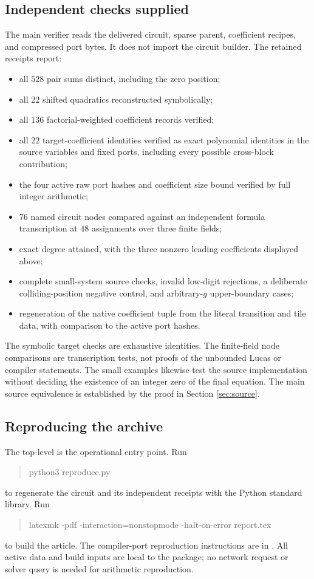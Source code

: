 \documentclass[11pt,a4paper]{article}
\theoremstyle{remark}
\newcommand{\file}[1]{\texttt{\path{#1}}}
\begin{document}
\subsection{Independent checks supplied}
The main verifier reads the delivered circuit, sparse parent,
coefficient recipes, and compressed port bytes. It does not import
the circuit builder. The retained receipts report:
\begin{itemize}
\item all \(528\) pair sums distinct, including the zero position;
\item all \(22\) shifted quadratics reconstructed symbolically;
\item all \(136\) factorial-weighted coefficient records verified;
\item all \(22\) target-coefficient identities verified as exact
polynomial identities in the source variables and fixed ports,
including every possible cross-block contribution;
\item the four active raw port hashes and coefficient size bound
verified by full integer arithmetic;
\item \(76\) named circuit nodes compared against an independent
formula transcription at \(48\) assignments over three finite fields;
\item exact degree attained, with the three nonzero leading
coefficients displayed above;
\item complete small-system source checks, invalid low-digit
rejections, a deliberate colliding-position negative control,
and arbitrary-\(g\) upper-boundary cases;
\item regeneration of the native coefficient tuple from the literal
transition and tile data, with comparison to the active port hashes.
\end{itemize}
The symbolic target checks are exhaustive identities. The finite-field
node comparisons are transcription tests, not proofs of the unbounded
Lucas or compiler statements. The small examples likewise test the
source implementation without deciding the existence of an integer
zero of the final equation. The main source equivalence is established
by the proof in Section \ref{sec:source}.

\subsection{Reproducing the archive}
The top-level \file{README.md} is the operational entry point.
Run
\begin{quote}\ttfamily
python3 reproduce.py
\end{quote}
to regenerate the circuit and its independent receipts with the
Python standard library. Run
\begin{quote}\ttfamily
latexmk -pdf -interaction=nonstopmode -halt-on-error report.tex
\end{quote}
to build the article. The compiler-port reproduction instructions
are in \file{vendor/README.md}. All active data and build inputs
are local to the package; no network request or solver query is
needed for arithmetic reproduction.
\end{document}
